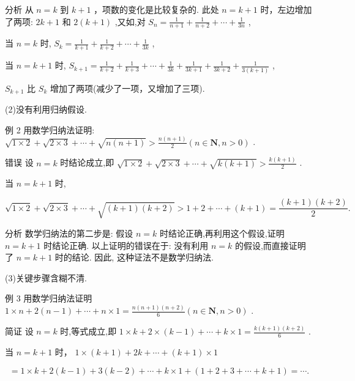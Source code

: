 \documentclass[10pt]{article}
\begin{document}
分析 从 \(n = k\) 到 \(k + 1\) ，项数的变化是比较复杂的. 此处 \(n = k + 1\) 时，左边增加了两项: \({2k} + 1\) 和 \(2\left( {k + 1}\right)\) ,又如,对 \({S}_{n} = \frac{1}{n + 1} + \frac{1}{n + 2} + \cdots  + \frac{1}{3n}\) ,

当 \(n = k\) 时, \({S}_{k} = \frac{1}{k + 1} + \frac{1}{k + 2} + \cdots  + \frac{1}{3k}\) ,

当 \(n = k + 1\) 时, \({S}_{k + 1} = \frac{1}{k + 2} + \frac{1}{k + 3} + \cdots  + \frac{1}{3k} + \frac{1}{{3k} + 1} + \frac{1}{{3k} + 2} + \frac{1}{3\left( {k + 1}\right) }\) ,

\({S}_{k + 1}\) 比 \({S}_{k}\) 增加了两项(减少了一项，又增加了三项).

(2)没有利用归纳假设.

例 2 用数学归纳法证明: \(\sqrt{1 \times  2} + \sqrt{2 \times  3} + \cdots  + \sqrt{n\left( {n + 1}\right) } > \frac{n\left( {n + 1}\right) }{2}\left( {n \in  \mathbf{N},n > 0}\right)\) .

错误 设 \(n = k\) 时结论成立,即 \(\sqrt{1 \times  2} + \sqrt{2 \times  3} + \cdots  + \sqrt{k\left( {k + 1}\right) } > \frac{k\left( {k + 1}\right) }{2}\) .

当 \(n = k + 1\) 时,

\[
\sqrt{1 \times  2} + \sqrt{2 \times  3} + \cdots  + \sqrt{\left( {k + 1}\right) \left( {k + 2}\right) } > 1 + 2 + \cdots  + \left( {k + 1}\right)  = \frac{\left( {k + 1}\right) \left( {k + 2}\right) }{2}.
\]

分析 数学归纳法的第二步是: 假设 \(n = k\) 时结论正确,再利用这个假设,证明 \(n = k + 1\) 时结论正确. 以上证明的错误在于: 没有利用 \(n = k\) 的假设,而直接证明了 \(n = k + 1\) 时的结论. 因此, 这种证法不是数学归纳法.

(3)关键步骤含糊不清.

例 3 用数学归纳法证明 \(1 \times  n + 2\left( {n - 1}\right)  + \cdots  + n \times  1 = \frac{n\left( {n + 1}\right) \left( {n + 2}\right) }{6}\left( {n \in  \mathbf{N},n > 0}\right)\) .

简证 设 \(n = k\) 时,等式成立,即 \(1 \times  k + 2 \times  \left( {k - 1}\right)  + \cdots  + k \times  1 = \frac{k\left( {k + 1}\right) \left( {k + 2}\right) }{6}\) .

当 \(n = k + 1\) 时， \(1 \times  \left( {k + 1}\right)  + {2k} + \cdots  + \left( {k + 1}\right)  \times  1\)

\[
= 1 \times  k + 2\left( {k - 1}\right)  + 3\left( {k - 2}\right)  + \cdots  + k \times  1 + \left( {1 + 2 + 3 + \cdots  + k + 1}\right)  = \cdots .
\]
\end{document}
